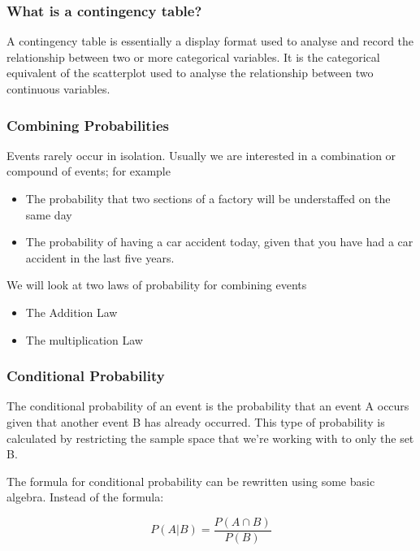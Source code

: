 \documentclass[IntroMain.tex]{subfiles}
\begin{document}
	\begin{frame}
		\frametitle{What is a contingency table?}
		
		A contingency table is essentially a display format used to analyse and record the relationship between two or more categorical variables. It is the categorical equivalent of the scatterplot used to analyse the relationship between two continuous variables.
		
		
	\end{frame}
	\begin{frame}
		\frametitle{Combining Probabilities}
		
		Events rarely occur in isolation. Usually we are interested in a combination or compound of events; for example
		\begin{itemize}
			\item The probability that two sections of a factory will be understaffed on the same day 
			\item The probability of having a car accident today, given that you have had a car accident in the last five years.
		\end{itemize}	
	\end{frame}
	\begin{frame}
		We will look at two laws of probability for combining events
		\begin{itemize}
			\item The Addition Law 
			\item The multiplication Law
		\end{itemize}	
	\end{frame}
	\begin{frame}
		\frametitle{Conditional Probability}
		The conditional probability of an event is the probability that an event A occurs given that another event B has already occurred. This type of probability is calculated by restricting the sample space that we’re working with to only the set B.
		
		The formula for conditional probability can be rewritten using some basic algebra. Instead of the formula:
		
		\[P(A | B) = \frac{P(A \cap B) }{P( B )}  \]
		
	\end{frame}
\end{document}

